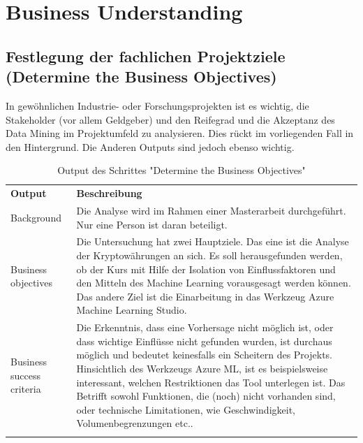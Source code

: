 \section{Business Understanding}
\subsection*{Festlegung der fachlichen Projektziele (Determine the Business Objectives)}
In  gewöhnlichen Industrie- oder Forschungsprojekten ist es wichtig, die Stakeholder (vor allem Geldgeber) und den Reifegrad und die Akzeptanz des Data Mining im Projektumfeld zu analysieren. Dies rückt im vorliegenden Fall in den Hintergrund. Die Anderen Outputs sind jedoch ebenso wichtig.

\begin{centering} \begin{longtable}[H]{|p{}|p{12cm}|}
\hline
\textbf{Output} & \textbf{Beschreibung} \\ 
\hhline{==}
Background & Die Analyse wird im Rahmen einer Masterarbeit durchgeführt. Nur eine Person ist daran beteiligt. \\
\hline
Business objectives & Die Untersuchung hat zwei Hauptziele. Das eine ist die Analyse der Kryptowährungen an sich. Es soll herausgefunden werden, ob der Kurs mit Hilfe der Isolation von Einflussfaktoren und den Mitteln des Machine Learning vorausgesagt werden können. Das andere Ziel ist die Einarbeitung in das Werkzeug Azure Machine Learning Studio. \\
\hline
Business success criteria & Die Erkenntnis, dass eine Vorhersage nicht möglich ist, oder dass wichtige Einflüsse nicht gefunden wurden, ist durchaus möglich und bedeutet keinesfalls ein Scheitern des Projekts. Hinsichtlich des Werkzeugs Azure ML, ist es beispielsweise interessant, welchen Restriktionen das Tool unterlegen ist. Das Betrifft sowohl Funktionen, die (noch) nicht vorhanden sind, oder technische Limitationen, wie Geschwindigkeit, Volumenbegrenzungen etc..\\
\hline
\caption{Output des Schrittes "Determine the Business Objectives"}
\end{longtable} \end{centering}
